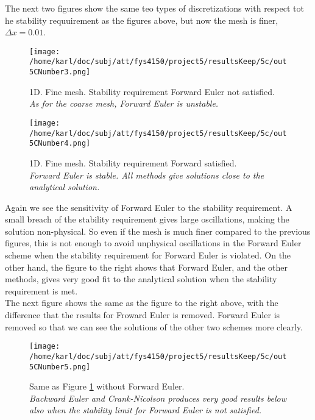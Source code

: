 \documentclass{article}
\begin{document}
The next two figures show the same teo types of discretizations with respect tot he stability requuirement as the figures above, but now the mesh is finer, $\Delta x= 0.01$.

\begin{minipage}{.45\textwidth} 
	\begin{figure}[H]
		\centering
		\texttt{[image: /home/karl/doc/subj/att/fys4150/project5/resultsKeep/5c/out5CNumber3.png]}
		\caption{1D. Fine mesh. Stability requirement Forward Euler not satisfied.\\ \textit{As for the coarse mesh, Forward Euler is unstable.}}
		\label{fig:fig3}
	\end{figure}
\end{minipage}\hfill
\begin{minipage}{.45\textwidth} 
	\begin{figure}[H]
		\centering
		\texttt{[image: /home/karl/doc/subj/att/fys4150/project5/resultsKeep/5c/out5CNumber4.png]}
		\caption{1D. Fine mesh. Stability requirement Forward satisfied.\\ \textit{Forward Euler is stable. All methods give solutions close to the analytical solution.}}
		\label{fig:1dFineMeshAll}
	\end{figure}
\end{minipage}\hfill
\vspace{2ex}

Again we see the sensitivity of Forward Euler to the stability requirement. A small breach of the stability requirement gives large oscillations, making the solution non-physical. So even if the mesh is much finer compared to the previous figures, this is not enough to avoid unphysical oscillations in the Forward Euler scheme when the stability requirement for Forward Euler is violated. On the other hand, the figure to the right shows that Forward Euler, and the other methods, gives very good fit to the analytical solution when the stability requirement is met.\\

The next figure shows the same as the figure to the right above, with the difference that the results for Froward Euler is removed. Forward Euler is removed so that we can see the solutions of the other two schemes more clearly.

\begin{figure}[H]
	\centering
	\texttt{[image: /home/karl/doc/subj/att/fys4150/project5/resultsKeep/5c/out5CNumber5.png]}
	\caption{Same as Figure \ref{fig:fig3} without Forward Euler. \\ \textit{Backward Euler and Crank-Nicolson produces very good results below also when the stability limit for Forward Euler is not satisfied.}}
	\label{1}
\end{figure}
\end{document}
